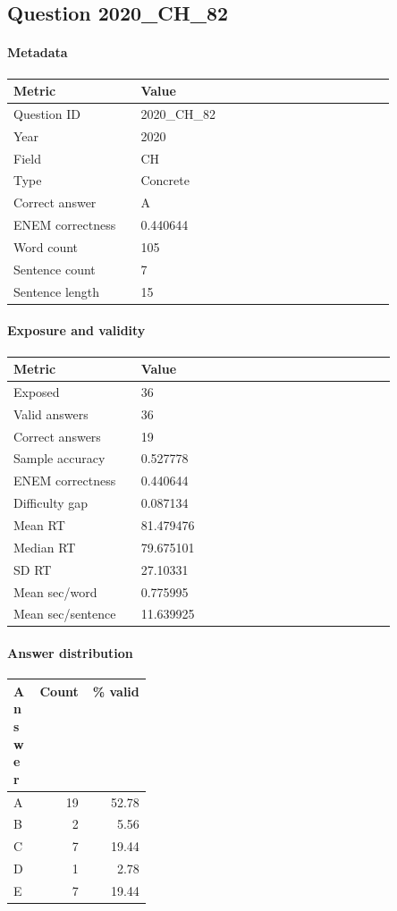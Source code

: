 \subsection*{Question 2020\_CH\_82}
\label{sec:q_2020_CH_82}
\paragraph{Metadata}
\begin{tabular}{p{0.30\linewidth}p{0.60\linewidth}}
\toprule
Metric & Value\\
\midrule
Question ID & 2020\_CH\_82\\
Year & 2020\\
Field & CH\\
Type & Concrete\\
Correct answer & A\\
ENEM correctness & 0.440644\\
Word count & 105\\
Sentence count & 7\\
Sentence length & 15\\
\bottomrule
\end{tabular}

\paragraph{Exposure and validity}
\begin{tabular}{p{0.30\linewidth}p{0.60\linewidth}}
\toprule
Metric & Value\\
\midrule
Exposed & 36\\
Valid answers & 36\\
Correct answers & 19\\
Sample accuracy & 0.527778\\
ENEM correctness & 0.440644\\
Difficulty gap & 0.087134\\
Mean RT & 81.479476\\
Median RT & 79.675101\\
SD RT & 27.10331\\
Mean sec/word & 0.775995\\
Mean sec/sentence & 11.639925\\
\bottomrule
\end{tabular}

\paragraph{Answer distribution}
\begin{tabular}{p{0.18\linewidth}rr}
\toprule
Answer & Count & \% valid\\
\midrule
A & 19 & 52.78\\
B & 2 & 5.56\\
C & 7 & 19.44\\
D & 1 & 2.78\\
E & 7 & 19.44\\
\bottomrule
\end{tabular}

